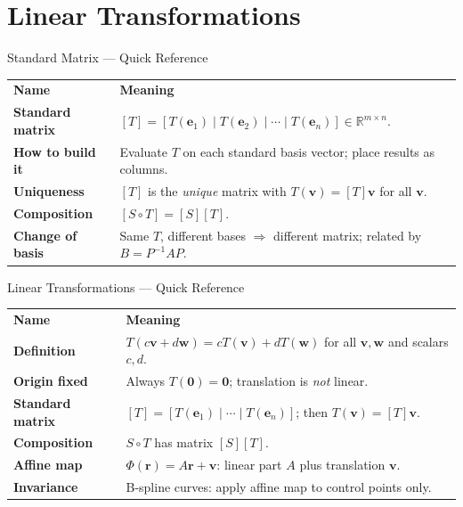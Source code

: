 

\section{Linear Transformations}

\begin{toolkitbox}{Standard Matrix --- Quick Reference}
\begin{tabular}{@{}p{}p{}@{}}
\textbf{Name} & \textbf{Meaning} \\
\textbf{Standard matrix}      & $[T] = [T(\mathbf{e}_1)\mid T(\mathbf{e}_2)\mid\cdots\mid T(\mathbf{e}_n)] \in \mathbb{R}^{m\times n}$. \\[4pt]
\textbf{How to build it}       & Evaluate $T$ on each standard basis vector; place results as columns. \\[4pt]
\textbf{Uniqueness}            & $[T]$ is the \emph{unique} matrix with $T(\mathbf{v}) = [T]\mathbf{v}$ for all $\mathbf{v}$. \\[4pt]
\textbf{Composition}           & $[S \circ T] = [S][T]$. \\[4pt]
\textbf{Change of basis}       & Same $T$, different bases $\Rightarrow$ different matrix; related by $B = P^{-1}AP$. \\
\end{tabular}
\end{toolkitbox}


\begin{toolkitbox}{Linear Transformations --- Quick Reference}
\begin{tabular}{@{}p{}p{}@{}}
\textbf{Name} & \textbf{Meaning} \\
\textbf{Definition}        & $T(c\mathbf{v} + d\mathbf{w}) = cT(\mathbf{v}) + dT(\mathbf{w})$ for all $\mathbf{v},\mathbf{w}$ and scalars $c,d$. \\[4pt]
\textbf{Origin fixed}      & Always $T(\mathbf{0}) = \mathbf{0}$; translation is \emph{not} linear. \\[4pt]
\textbf{Standard matrix}   & $[T] = [T(\mathbf{e}_1)\mid\cdots\mid T(\mathbf{e}_n)]$; then $T(\mathbf{v}) = [T]\mathbf{v}$. \\[4pt]
\textbf{Composition}       & $S \circ T$ has matrix $[S][T]$. \\[4pt]
\textbf{Affine map}        & $\Phi(\mathbf{r}) = A\mathbf{r} + \mathbf{v}$: linear part $A$ plus translation $\mathbf{v}$. \\[4pt]
\textbf{Invariance}        & B-spline curves: apply affine map to control points only. \\
\end{tabular}
\end{toolkitbox}


